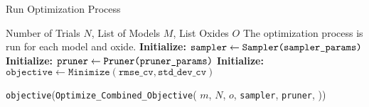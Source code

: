 \begin{algorithm}
\caption{Run Optimization Process}
\label{alg:study_function}
\begin{algorithmic}[1]
\Require Number of Trials $N$, List of Models $M$, List Oxides $O$ \label{step:initialize_run_process}
\Ensure The optimization process is run for each model and oxide. 
\State \textbf{Initialize:} $\texttt{sampler} \gets \texttt{Sampler(\texttt{sampler\_params})}$ \label{step:initialize_sampler}
\State \textbf{Initialize:} $\texttt{pruner} \gets \texttt{Pruner(\texttt{pruner\_params})}$ \label{step:initialize_pruner}
\State \textbf{Initialize:} $\texttt{objective} \gets \texttt{Minimize}(\texttt{rmse\_cv}, \texttt{std\_dev\_cv})$ \label{step:initialize_objective}

 \label{step:oxide_loop}
     \label{step:model_loop}
        \State \texttt{objective}(\texttt{Optimize\_Combined\_Objective}( \label{step:optimize_combined_objective}
        \State \hspace{1.5em} $m$, \label{step:model_param_study}
        \State \hspace{1.5em} $N$, \label{step:trials_param_study}
        \State \hspace{1.5em} $o$, \label{step:oxide_param_study}
        \State \hspace{1.5em} \texttt{sampler}, \label{step:sampler_param_study}
        \State \hspace{1.5em} \texttt{pruner}, \label{step:pruner_param_study}
        \State )) \label{step:optimize_combined_objective}
    \EndFor
\EndFor
\end{algorithmic}
\end{algorithm}

